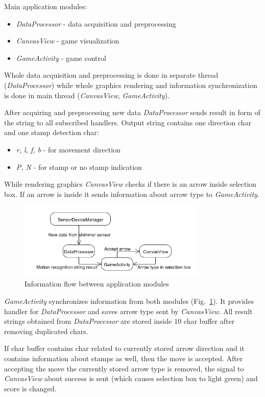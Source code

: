 \documentclass[conference]{IEEEtran}
\begin{document}
Main application modules:
\begin{itemize}
    \item \emph{DataProcessor} - data acquisition and preprocessing
    \item \emph{CanvasView} - game visualization
    \item \emph{GameActivity} - game control
\end{itemize}

Whole data acquisition and preprocessing is done in separate thread (\emph{DataProcessor}) while whole graphics rendering and information synchronization is done in main thread (\emph{CanvasView}, \emph{GameActivity}).

After acquiring and preprocessing new data \emph{DataProcessor} sends result in form of the string to all subscribed handlers. Output string contains one direction char and one stamp detection char:
\begin{itemize}
    \item \emph{r, l, f, b} - for movement direction
    \item \emph{P, N} - for stamp or no stamp indication
\end{itemize}

While rendering graphics \emph{CanvasView} checks if there is an arrow inside selection box.
If an arrow is inside it sends information about arrow type to \emph{GameActivity}.

\begin{figure}[!h]
    \centering
    \includegraphics[width=9cm]{Images/Synchronization.png}
    \caption{Information flow between application modules}
    \label{fig:Synchronization}
\end{figure}

\emph{GameActivity} synchronizes information from both modules (Fig.~\ref{fig:Synchronization}).
It provides handler for \emph{DataProcessor} and saves arrow type sent by \emph{CanvasView}.
All result strings obtained from \emph{DataProcessor} are stored inside $10$ char buffer after removing duplicated chars.

If char buffer contains char related to currently stored arrow direction and it contains information about stamps as well, then the move is accepted. After accepting the move the currently stored arrow type is removed, the signal to \emph{CanvasView} about success is sent (which causes selection box to light green) and score is changed.
\end{document}
